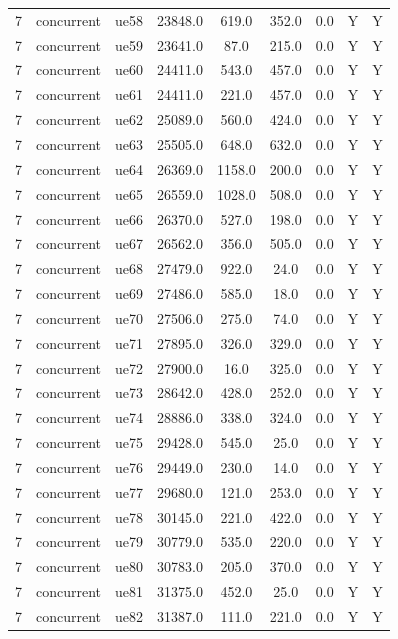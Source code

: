 \begin{table}[ht]
\begin{tabular}{|c|c|c|c|c|c|c|c|c|}
7 & concurrent & ue58 & 23848.0 & 619.0 & 352.0 & 0.0 & Y & Y \\
7 & concurrent & ue59 & 23641.0 & 87.0 & 215.0 & 0.0 & Y & Y \\
7 & concurrent & ue60 & 24411.0 & 543.0 & 457.0 & 0.0 & Y & Y \\
7 & concurrent & ue61 & 24411.0 & 221.0 & 457.0 & 0.0 & Y & Y \\
7 & concurrent & ue62 & 25089.0 & 560.0 & 424.0 & 0.0 & Y & Y \\
7 & concurrent & ue63 & 25505.0 & 648.0 & 632.0 & 0.0 & Y & Y \\
7 & concurrent & ue64 & 26369.0 & 1158.0 & 200.0 & 0.0 & Y & Y \\
7 & concurrent & ue65 & 26559.0 & 1028.0 & 508.0 & 0.0 & Y & Y \\
7 & concurrent & ue66 & 26370.0 & 527.0 & 198.0 & 0.0 & Y & Y \\
7 & concurrent & ue67 & 26562.0 & 356.0 & 505.0 & 0.0 & Y & Y \\
7 & concurrent & ue68 & 27479.0 & 922.0 & 24.0 & 0.0 & Y & Y \\
7 & concurrent & ue69 & 27486.0 & 585.0 & 18.0 & 0.0 & Y & Y \\
7 & concurrent & ue70 & 27506.0 & 275.0 & 74.0 & 0.0 & Y & Y \\
7 & concurrent & ue71 & 27895.0 & 326.0 & 329.0 & 0.0 & Y & Y \\
7 & concurrent & ue72 & 27900.0 & 16.0 & 325.0 & 0.0 & Y & Y \\
7 & concurrent & ue73 & 28642.0 & 428.0 & 252.0 & 0.0 & Y & Y \\
7 & concurrent & ue74 & 28886.0 & 338.0 & 324.0 & 0.0 & Y & Y \\
7 & concurrent & ue75 & 29428.0 & 545.0 & 25.0 & 0.0 & Y & Y \\
7 & concurrent & ue76 & 29449.0 & 230.0 & 14.0 & 0.0 & Y & Y \\
7 & concurrent & ue77 & 29680.0 & 121.0 & 253.0 & 0.0 & Y & Y \\
7 & concurrent & ue78 & 30145.0 & 221.0 & 422.0 & 0.0 & Y & Y \\
7 & concurrent & ue79 & 30779.0 & 535.0 & 220.0 & 0.0 & Y & Y \\
7 & concurrent & ue80 & 30783.0 & 205.0 & 370.0 & 0.0 & Y & Y \\
7 & concurrent & ue81 & 31375.0 & 452.0 & 25.0 & 0.0 & Y & Y \\
7 & concurrent & ue82 & 31387.0 & 111.0 & 221.0 & 0.0 & Y & Y \\

\end{tabular}
\end{table}
